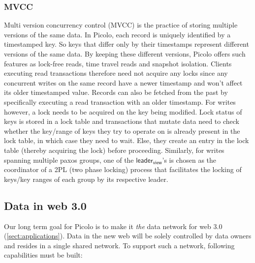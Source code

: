\subsubsection{MVCC}
Multi version concurrency control (MVCC) is the practice of storing multiple versions of the same data. In \textsf{Picolo}, each record is uniquely identified by a timestamped key. So keys that differ only by their timestamps represent different versions of the same data. By keeping these different versions, \textsf{Picolo} offers such features as lock-free reads, time travel reads and snapshot isolation. Clients executing read transactions therefore need not acquire any locks since any concurrent writes on the same record have a newer timestamp and won't affect its older timestamped value. Records can also be fetched from the past by specifically executing a read transaction with an older timestamp. For writes however, a lock needs to be acquired on the key being modified. Lock status of keys is stored in a lock table and transactions that mutate data need to check whether the key/range of keys they try to operate on is already present in the lock table, in which case they need to wait. Else, they create an entry in the lock table (thereby acquiring the lock) before proceeding. Similarly, for writes spanning multiple paxos groups, one of the $\textsf{leader}_\textsf{view}$'s is chosen as the coordinator of a \textsf{2PL} (two phase locking) process that facilitates the locking of keys/key ranges of each group by its respective leader.

\subsection{Data in web 3.0}
Our long term goal for \textsf{Picolo} is to make it \textit{the} data network for web 3.0 (\cref{sect:applications}). Data in the new web will be solely controlled by data owners and resides in a single shared network. To support such a network, following capabilities must be built:
